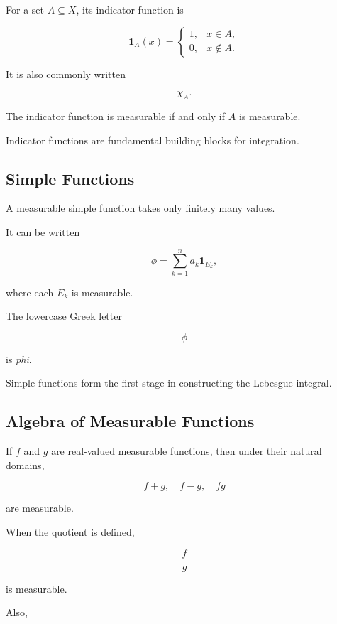 For a set \(A\subseteq X\), its indicator function is

\[
\boxed{
\mathbf{1}_A(x)
=
\begin{cases}
1, & x\in A,\\
0, & x\notin A.
\end{cases}
}
\]

It is also commonly written

\[
\chi_A.
\]

The indicator function is measurable if and only if \(A\) is measurable.

Indicator functions are fundamental building blocks for integration.

\subsection{Simple Functions}
\label{subsec:simple-functions}

A measurable simple function takes only finitely many values.

It can be written

\[
\boxed{
\phi
=
\sum_{k=1}^{n}
a_k\mathbf{1}_{E_k},
}
\]

where each \(E_k\) is measurable.

The lowercase Greek letter

\[
\phi
\]

is \emph{phi}.

Simple functions form the first stage in constructing the Lebesgue
integral.

\subsection{Algebra of Measurable Functions}
\label{subsec:algebra-measurable-functions}

If \(f\) and \(g\) are real-valued measurable functions, then under their
natural domains,

\[
\boxed{
f+g,
\quad
f-g,
\quad
fg
}
\]

are measurable.

When the quotient is defined,

\[
\boxed{
\frac{f}{g}
}
\]

is measurable.

Also,

